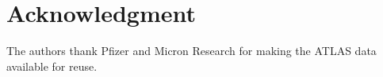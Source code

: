 \documentclass[conference]{IEEEtran}
\begin{document}
\section*{Acknowledgment}
The authors thank Pfizer and Micron Research for making the ATLAS data available for reuse.




\end{document}
